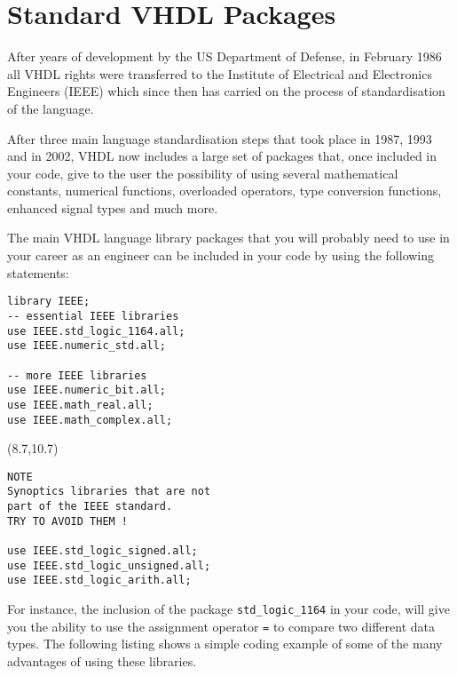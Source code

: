 \null\newpage
\thispagestyle{empty}
\mbox{}

\chapter{Standard VHDL Packages}
After years of development by the US Department of Defense, in February 1986 all VHDL rights were transferred to the Institute of Electrical and Electronics Engineers (IEEE) which since then has carried on the process of standardisation of the language. 

After three main language standardisation steps that took place in 1987, 1993 and in 2002, VHDL now includes a large set of packages that, once included in your code, give to the user the possibility of using several mathematical constants, numerical functions, overloaded operators, type conversion functions, enhanced signal types and much more.

The main VHDL language library packages that you will probably need to use in your career as an engineer can be included in your code by using the following statements:

{\scriptsize
\begin{verbatim}
library IEEE;
-- essential IEEE libraries
use IEEE.std_logic_1164.all;
use IEEE.numeric_std.all;

-- more IEEE libraries
use IEEE.numeric_bit.all;
use IEEE.math_real.all;
use IEEE.math_complex.all;
\end{verbatim}
}

\begin{textblock}{7}(8.7,10.7)
{\tiny
\begin{verbatim}
NOTE
Synoptics libraries that are not
part of the IEEE standard. 
TRY TO AVOID THEM !

use IEEE.std_logic_signed.all;
use IEEE.std_logic_unsigned.all;
use IEEE.std_logic_arith.all;
\end{verbatim}
}
\end{textblock}

For instance, the inclusion of the package \texttt{std\_logic\_1164} in your code, will give you the ability to use the assignment operator \texttt{=} to compare two different data types. The following listing shows a simple coding example of some of the many advantages of using these libraries.

